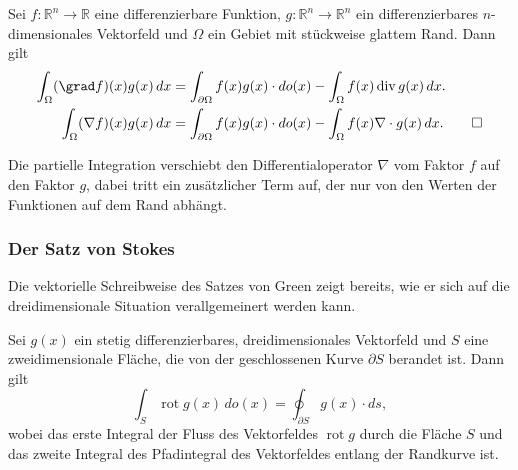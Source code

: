 \begin{satz}
Sei $f\colon\mathbb{R}^n\to\mathbb{R}$ eine differenzierbare Funktion,
$g\colon\mathbb{R}^n\to\mathbb{R}^n$ ein differenzierbares
$n$-dimensionales Vektorfeld und $\Omega$ ein Gebiet mit stückweise
glattem Rand.
Dann gilt
\begin{align*}
\int_{\Omega} (\grad f)(x) g(x)\,dx
&=
\int_{\partial\Omega} f(x)g(x)\cdot do(x)
-
\int_{\Omega} f(x)\operatorname{div}g(x)\,dx.
\\
\int_{\Omega} (\nabla f)(x)g(x)\,dx
&=
\int_{\partial\Omega} f(x)g(x)\cdot do(x)
-
\int_{\Omega} f(x)\nabla\cdot g(x)\,dx.
\qedhere
\end{align*}
\end{satz}

Die partielle Integration verschiebt den Differentialoperator $\nabla$
vom Faktor $f$ auf den Faktor $g$, dabei tritt ein zusätzlicher Term
auf, der nur von den Werten der Funktionen auf dem Rand abhängt.


%
%
\subsubsection{Der Satz von Stokes}
Die vektorielle Schreibweise des Satzes von Green zeigt bereits,
wie er sich auf die dreidimensionale Situation verallgemeinert werden kann.

\begin{satz}[Stokes]
\label{buch:felder:fundamentallemma:satz:stokes}
%
%
Sei $g(x)$ ein stetig differenzierbares, dreidimensionales Vektorfeld
und $S$ eine zweidimensionale Fläche, die von der geschlossenen
Kurve $\partial S$ berandet ist.
Dann gilt
\begin{equation}
\int_S \operatorname{rot} g(x)\,do(x)
=
\oint_{\partial S} g(x)\cdot ds,
\label{buch:felder:fundamentallemma:eqn:stokes}
\end{equation}
wobei das erste Integral der Fluss des Vektorfeldes $\operatorname{rot}g$
durch die Fläche $S$ und das zweite Integral des Pfadintegral des
Vektorfeldes entlang der Randkurve ist.
\end{satz}


